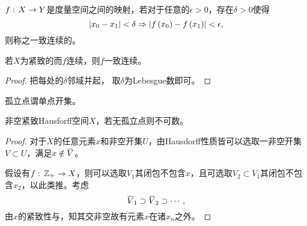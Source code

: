 \documentclass{ctexrep}
\begin{document}
  \begin{definition}
    \label{def:unifcontin}
    $f:\, X \rightarrow Y$是度量空间之间的映射，若对于任意的$\epsilon>0$，存在$\delta>0$使得
    \[ \abs{x_0-x_1} < \delta \Rightarrow \abs{f\left(x_0\right) - f\left(x_1\right)} < \epsilon, \]
    则称之一致连续的。
  \end{definition}
  \begin{theorem}
    \label{thm:compactunifcontin}
    若$X$为紧致的而$f$连续，则$f$一致连续。
  \end{theorem}
  \begin{proof}
    把每处的$\delta$邻域并起， 取$\delta$为Lebesgue数即可。
  \end{proof}
  \begin{definition}
    孤立点谓单点开集。
  \end{definition}
  \begin{theorem}
    \label{thm:uncountableR}
    非空紧致Hausforff空间$X$，若无孤立点则不可数。
  \end{theorem}
  \begin{proof}
    对于$X$的任意元素$x$和非空开集$U$，由Hausdorff性质皆可以选取一非空开集$V\subset{U}$，满足$x \notin \clo{V}$。\par
    假设有$f:\, \mathbb{Z}_+ \rightarrow X$，则可以选取$V_1$其闭包不包含$x$，且可选取$V_2 \subset V_1$其闭包不包含$x_2$，以此类推。考虑
    \[ \clo{V}_1 \supset \clo{V}_2 \supset \cdots, \]
    由$x$的紧致性与，知其交非空故有元素$x$在诸$x_n$之外。
  \end{proof}
\end{document}
